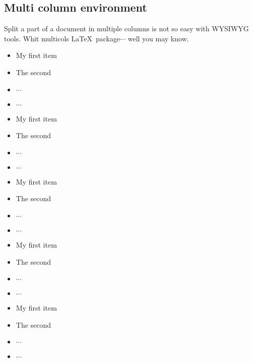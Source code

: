 \subsection{Multi column environment}
Split a part of a document in multiple columns is not so easy with WYSIWYG tools.
Whit multicols \LaTeX\ package$\cdots$ well you may know.

\begin{multicols}{3}
\begin{itemize}
\item My first item
\item The second
\item $\cdots$
\item $\cdots$
\end{itemize}
\begin{itemize}
\item My first item
\item The second
\item $\cdots$
\item $\cdots$
\end{itemize}
\begin{itemize}
\item My first item
\item The second
\item $\cdots$
\item $\cdots$
\end{itemize}
\end{multicols}


\blindtext[1]

\begin{multicols}{2}
  \blindtext[1]
\end{multicols}

\begin{multicols}{3}
  \blindtext[1]
\end{multicols}

\begin{multicols}{2}
  \blindtext[1]
\end{multicols}


\begin{multicols}{3}
\begin{itemize}
\item My first item
\item The second
\item $\cdots$
\item $\cdots$
\end{itemize}
\blindtext[1]
\columnbreak
\begin{itemize}
\item My first item
\item The second
\item $\cdots$
\item $\cdots$
\end{itemize}
\end{multicols}

